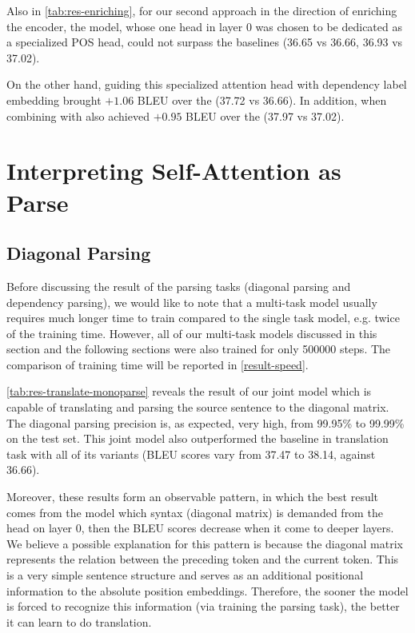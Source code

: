 Also in \cref{tab:res-enriching}, for our second approach in the direction of enriching the encoder, the \SpecPOS model, whose one head in layer 0 was chosen to be dedicated as a specialized POS head, could not surpass the baselines (36.65 vs 36.66, 36.93 vs 37.02).

On the other hand, guiding this specialized attention head with dependency label embedding brought $+1.06$ BLEU over the \transformerbase (37.72 vs 36.66).
In addition, \SpecDep when combining with \transformerrel also achieved $+0.95$ BLEU over the \transformerrel (37.97 vs 37.02).

\section{Interpreting Self-Attention as Parse}
\label{result-promote}

\subsection{Diagonal Parsing}
\label{result-promote-diagonal}

Before discussing the result of the parsing tasks (diagonal parsing and dependency parsing), we would like to note that a multi-task model usually requires much longer time to train compared to the single task model, e.g. twice of the training time.
However, all of our multi-task models discussed in this section and the following sections were also trained for only 500000 steps.
The comparison of training time will be reported in \cref{result-speed}.

\cref{tab:res-translate-monoparse} reveals the result of our joint model which is capable of translating and parsing the source sentence to the diagonal matrix.
The diagonal parsing precision is, as expected, very high, from 99.95\% to 99.99\% on the test set.
This joint model also outperformed the baseline in translation task with all of its variants (BLEU scores vary from 37.47 to 38.14, against 36.66).

Moreover, these results form an observable pattern, in which the best result comes from the model which syntax (diagonal matrix) is demanded from the head on layer 0, then the BLEU scores decrease when it come to deeper layers.
We believe a possible explanation for this pattern is because the diagonal matrix represents the relation between the preceding token and the current token.
This is a very simple sentence structure and serves as an additional positional information to the absolute position embeddings.
Therefore, the sooner the model is forced to recognize this information (via training the parsing task), the better it can learn to do translation.

